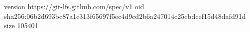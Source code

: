 version https://git-lfs.github.com/spec/v1
oid sha256:06b2d693bc87a1e313f65697f5ec4d9cd2b6a247014c25ebdcef15d48dafd91d
size 105401
